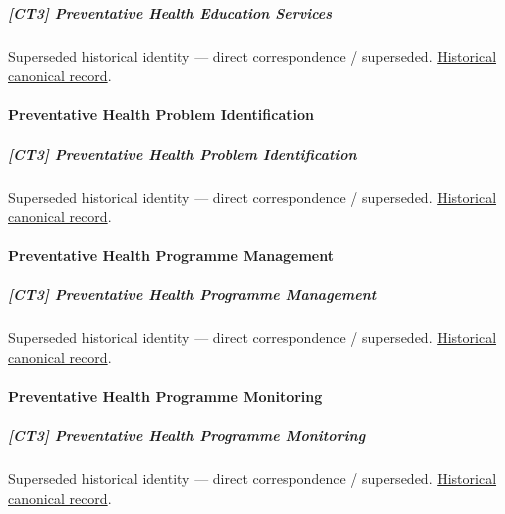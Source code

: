 \subparagraph{[CT3] Preventative Health Education Services}

\par\label{element:dbe10959237f405caeadef2a5748303a}
Superseded historical identity — direct correspondence / superseded. \href{../../../../continuum/strategy/capability/dbe10959237f405caeadef2a5748303a.md}{Historical canonical record}.\par

\paragraph{Preventative Health Problem Identification}

\subparagraph{[CT3] Preventative Health Problem Identification}

\par\label{element:b35d3521141c419fb676a79b2ede40bd}
Superseded historical identity — direct correspondence / superseded. \href{../../../../continuum/strategy/capability/b35d3521141c419fb676a79b2ede40bd.md}{Historical canonical record}.\par

\paragraph{Preventative Health Programme Management}

\subparagraph{[CT3] Preventative Health Programme Management}

\par\label{element:d71def9e76a544ff9761c672bb24f3be}
Superseded historical identity — direct correspondence / superseded. \href{../../../../continuum/strategy/capability/d71def9e76a544ff9761c672bb24f3be.md}{Historical canonical record}.\par

\paragraph{Preventative Health Programme Monitoring}

\subparagraph{[CT3] Preventative Health Programme Monitoring}

\par\label{element:e05f6310f6d544efaca5568604f27dd8}
Superseded historical identity — direct correspondence / superseded. \href{../../../../continuum/strategy/capability/e05f6310f6d544efaca5568604f27dd8.md}{Historical canonical record}.\par

